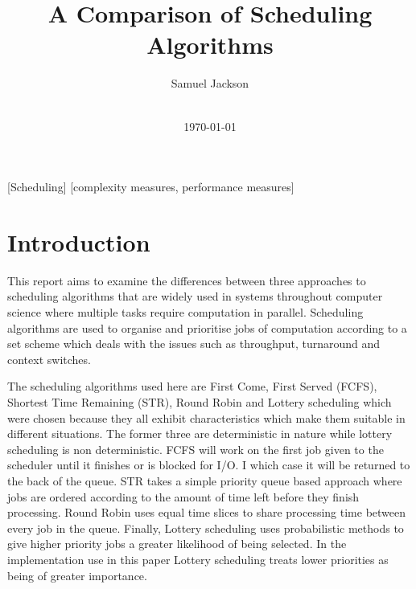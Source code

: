 \documentclass{acm_proc_article-sp}
\begin{document}
\title{A Comparison of Scheduling Algorithms}
\author{
\alignauthor
Samuel Jackson\\
       \\
}
\date{\today}

\maketitle
\begin{abstract}

\end{abstract}

[Scheduling]
[complexity measures, performance measures]



\section{Introduction}
This report aims to examine the differences between three approaches to scheduling algorithms that are widely used in systems throughout computer science where multiple tasks require computation in parallel. Scheduling algorithms are used to organise and prioritise jobs of computation according to a set scheme which deals with the issues such as throughput, turnaround and context switches.

The scheduling algorithms used here are First Come, First Served (FCFS), Shortest Time Remaining (STR), Round Robin and Lottery scheduling which were chosen because they all exhibit characteristics which make them suitable in different situations. The former three are deterministic in nature while lottery scheduling is non deterministic. FCFS will work on the first job given to the scheduler until it finishes or is blocked for I/O. I which case it will be returned to the back of the queue. STR takes a simple priority queue based approach where jobs are ordered according to the amount of time left before they finish processing. Round Robin uses equal time slices to share processing time between every job in the queue. Finally, Lottery scheduling uses probabilistic methods to give higher priority jobs a greater likelihood of being selected. In the implementation use in this paper Lottery scheduling treats lower priorities as being of greater importance.
\end{document}
